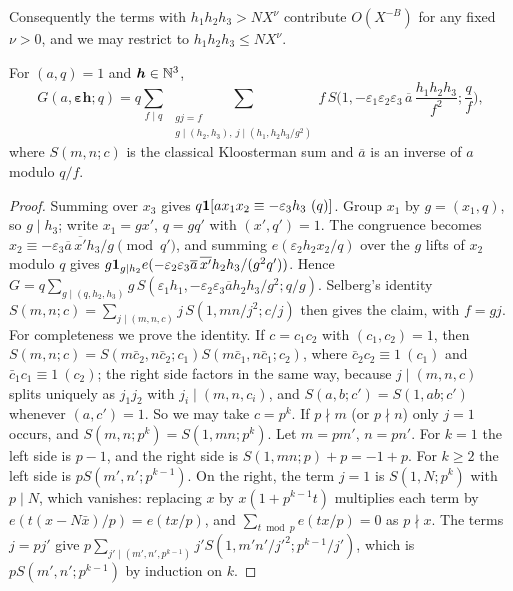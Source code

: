 \documentclass[11pt,colorlinks]{charlie}
\begin{document}
Consequently the terms with $h_1h_2h_3>NX^{\nu}$ contribute $O(X^{-B})$ for any fixed $\nu>0$, and we may restrict to $h_1h_2h_3\le NX^\nu$.

\begin{lemma}\label{lem:complete}
For $(a,q)=1$ and $\boldsymbol h\in\mathbb{N}^3$,
\[
 G(a,\boldsymbol\varepsilon\boldsymbol h;q)=q\sum_{f\mid q}\ \sum_{\substack{gj=f\\ g\mid(h_2,h_3),\ j\mid(h_1,h_2h_3/g^2)}}f\,S\Big(1,-\varepsilon_1\varepsilon_2\varepsilon_3\,\overline a\,\frac{h_1h_2h_3}{f^2};\frac qf\Big),
\]
where $S(m,n;c)$ is the classical Kloosterman sum and $\overline a$ is an inverse of $a$ modulo $q/f$.
\end{lemma}
\begin{proof}
Summing over $x_3$ gives $q\one[ax_1x_2\equiv-\varepsilon_3h_3\ (q)]$. Group $x_1$ by $g=(x_1,q)$, so $g\mid h_3$; write $x_1=gx'$, $q=gq'$ with $(x',q')=1$. The congruence becomes $x_2\equiv-\varepsilon_3\overline a\,\overline{x'}h_3/g\pmod{q'}$, and summing $e(\varepsilon_2h_2x_2/q)$ over the $g$ lifts of $x_2$ modulo $q$ gives $g\mathbf{1}_{g\mid h_2}e(-\varepsilon_2\varepsilon_3\overline a\,\overline{x'}h_2h_3/(g^2q'))$. Hence $G=q\sum_{g\mid(q,h_2,h_3)}g\,S(\varepsilon_1h_1,-\varepsilon_2\varepsilon_3\overline a h_2h_3/g^2;q/g)$. Selberg's identity $S(m,n;c)=\sum_{j\mid(m,n,c)}j\,S(1,mn/j^2;c/j)$ then gives the claim, with $f=gj$. For completeness we prove the identity. If $c=c_1c_2$ with $(c_1,c_2)=1$, then $S(m,n;c)=S(m\bar c_2,n\bar c_2;c_1)S(m\bar c_1,n\bar c_1;c_2)$, where $\bar c_2c_2\equiv1\ (c_1)$ and $\bar c_1c_1\equiv1\ (c_2)$; the right side factors in the same way, because $j\mid(m,n,c)$ splits uniquely as $j_1j_2$ with $j_i\mid(m,n,c_i)$, and $S(a,b;c')=S(1,ab;c')$ whenever $(a,c')=1$. So we may take $c=p^k$. If $p\nmid m$ (or $p\nmid n$) only $j=1$ occurs, and $S(m,n;p^k)=S(1,mn;p^k)$. Let $m=pm'$, $n=pn'$. For $k=1$ the left side is $p-1$, and the right side is $S(1,mn;p)+p=-1+p$. For $k\ge2$ the left side is $pS(m',n';p^{k-1})$. On the right, the term $j=1$ is $S(1,N;p^k)$ with $p\mid N$, which vanishes: replacing $x$ by $x(1+p^{k-1}t)$ multiplies each term by $e(t(x-N\bar x)/p)=e(tx/p)$, and $\sum_{t\bmod p}e(tx/p)=0$ as $p\nmid x$. The terms $j=pj'$ give $p\sum_{j'\mid(m',n',p^{k-1})}j'S(1,m'n'/j'^2;p^{k-1}/j')$, which is $pS(m',n';p^{k-1})$ by induction on $k$.
\end{proof}
\end{document}
